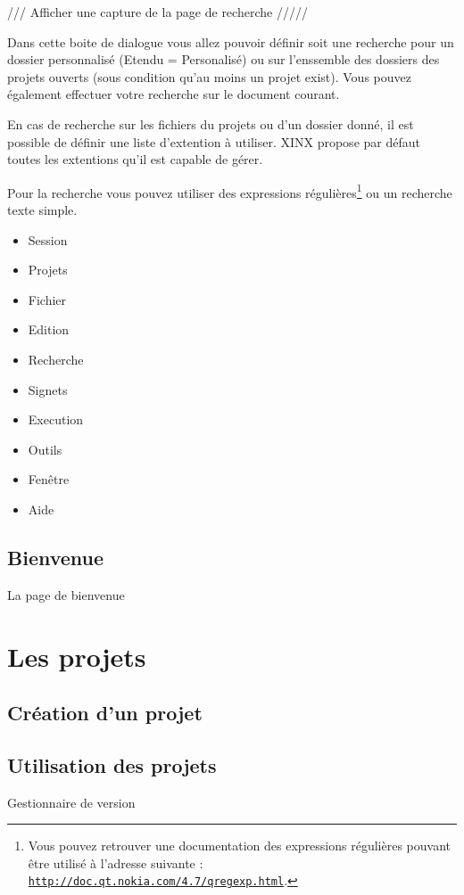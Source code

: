 \documentclass[a4paper,10pt,twoside]{book}
\begin{document}
/// Afficher une capture de la page de recherche /////

Dans cette boite de dialogue vous allez pouvoir définir soit une recherche pour un dossier personnalisé (Etendu = Personalisé) ou sur l'enssemble des dossiers des projets ouverts (sous condition qu'au moins un projet exist). Vous pouvez également effectuer votre recherche sur le document courant.

En cas de recherche sur les fichiers du projets ou d'un dossier donné, il est possible de définir une liste d'extention à utiliser. XINX propose par défaut toutes les extentions qu'il est capable de gérer. 

Pour la recherche vous pouvez utiliser des expressions régulières\footnote{Vous pouvez retrouver une documentation des expressions régulières pouvant être utilisé à l'adresse suivante : \hyperref{http://doc.qt.nokia.com/4.7/qregexp.html}{introduction}{}{\nolinkurl{http://doc.qt.nokia.com/4.7/qregexp.html}}.} ou un recherche texte simple.


\begin{itemize}
  \item Session 
  \item Projets
  \item Fichier
  \item Edition
  \item Recherche
  \item Signets
  \item Execution
  \item Outils
  \item Fenêtre
  \item Aide
\end{itemize}

\subsection{Bienvenue}
\label{sub:bienvenue}

La page de bienvenue

\section{Les projets}
\label{sec:Projets}

\subsection{Création d'un projet}

\subsection{Utilisation des projets}
\label{sec:RCS}
Gestionnaire de version
\end{document}
